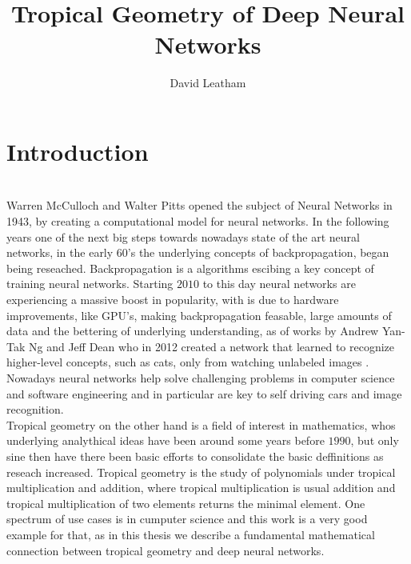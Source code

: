 \documentclass{article}
\title{Tropical Geometry of Deep Neural Networks}
\author{David Leatham}
\theoremstyle{definition}
\begin{document}
\maketitle

	\newpage
  
\tableofcontents

\newpage


\section{Introduction} 
\leavevmode
\\
Warren McCulloch and Walter Pitts opened the subject of Neural Networks in 1943, by creating a computational model for neural networks. In the following years one of the next big steps towards nowadays state of the art neural networks, in the early 60's the underlying concepts of backpropagation, began being reseached. Backpropagation is a algorithms escibing a key concept of training neural networks. Starting $2010$ to this day neural networks are experiencing a massive boost in popularity, with is due to hardware improvements, like GPU's, making backpropagation feasable, large amounts of data and the bettering of underlying understanding, as of works by Andrew Yan-Tak Ng and Jeff Dean who in 2012 created a network that learned to recognize higher-level concepts, such as cats, only from watching unlabeled images \cite{DBLP:journals/corr/abs-1112-6209}. Nowadays neural networks help solve challenging problems in computer science and software engineering and in particular are key to self driving cars and image recognition. \\
Tropical geometry on the other hand is a field of interest in mathematics, whos underlying analythical ideas have been around some years before $1990$, but only sine then have there been basic efforts to consolidate the basic deffinitions as reseach increased. Tropical geometry is the study of polynomials under tropical multiplication and addition, where tropical multiplication is usual addition and tropical multiplication of two elements returns the minimal element. One spectrum of use cases is in cumputer science and this work is a very good example for that, as in this thesis we describe a fundamental mathematical connection between tropical geometry and deep neural networks. \\
\end{document}
